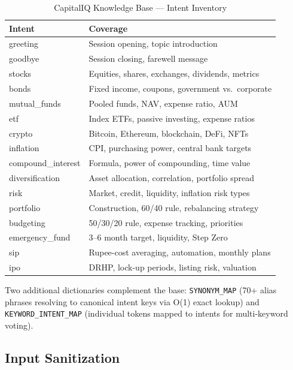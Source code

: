\documentclass[12pt, a4paper]{article}
\begin{document}
\begin{table}[ht]
\centering
\caption{CapitalIQ Knowledge Base --- Intent Inventory}
\begin{tabularx}{\linewidth}{>{\ttfamily}l X}
\toprule
\rowcolor{tabh!12}
\textrm{Intent} & Coverage \\
\midrule
greeting        & Session opening, topic introduction \\
goodbye         & Session closing, farewell message \\
stocks          & Equities, shares, exchanges, dividends, metrics \\
bonds           & Fixed income, coupons, government vs.\ corporate \\
mutual\_funds   & Pooled funds, NAV, expense ratio, AUM \\
etf             & Index ETFs, passive investing, expense ratios \\
crypto          & Bitcoin, Ethereum, blockchain, DeFi, NFTs \\
inflation       & CPI, purchasing power, central bank targets \\
compound\_interest & Formula, power of compounding, time value \\
diversification & Asset allocation, correlation, portfolio spread \\
risk            & Market, credit, liquidity, inflation risk types \\
portfolio       & Construction, 60/40 rule, rebalancing strategy \\
budgeting       & 50/30/20 rule, expense tracking, priorities \\
emergency\_fund & 3--6 month target, liquidity, Step Zero \\
sip             & Rupee-cost averaging, automation, monthly plans \\
ipo             & DRHP, lock-up periods, listing risk, valuation \\
\bottomrule
\end{tabularx}
\end{table}

Two additional dictionaries complement the base: \texttt{SYNONYM\_MAP}
(70+ alias phrases resolving to canonical intent keys via O(1) exact lookup)
and \texttt{KEYWORD\_INTENT\_MAP} (individual tokens mapped to intents
for multi-keyword voting).

\subsection{Input Sanitization}
\end{document}
